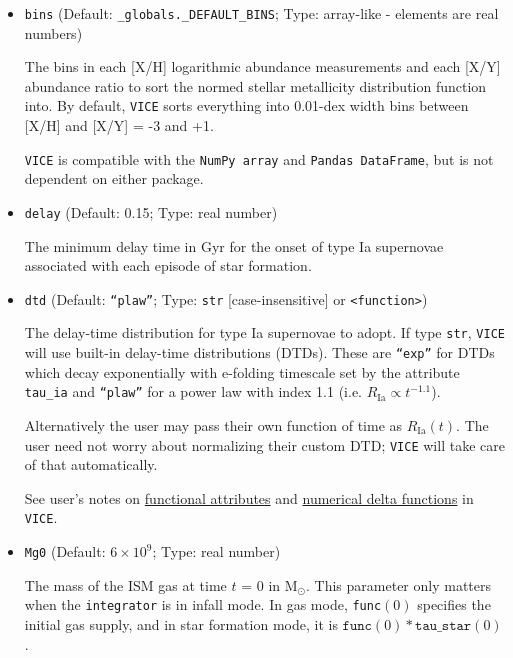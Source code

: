 \documentclass{report}
\begin{document}
\begin{itemize}
	\item{ %
		\texttt{bins} (Default: \texttt{\_globals.\_DEFAULT\_BINS}; Type: 
		array-like - elements are real numbers) 
		\par
		The bins in each [X/H] logarithmic abundance measurements and each 
		[X/Y] abundance ratio to sort the normed stellar metallicity 
		distribution function into. By default, \texttt{VICE} sorts everything 
		into 0.01-dex width bins between [X/H] and [X/Y] = -3 and +1. 
		\par
		\texttt{VICE} is compatible with the \texttt{NumPy array} and 
		\texttt{Pandas DataFrame}, but is not dependent on either package. 
	}

	\item{ %
		\texttt{delay} (Default: 0.15; Type: real number) 
		\par
		The minimum delay time in Gyr for the onset of type Ia supernovae 
		associated with each episode of star formation. 
	}

	\item{ %
		\texttt{dtd} (Default: \texttt{``plaw''}; Type: \texttt{str} 
		[case-insensitive] or \texttt{<function>}) 
		\par 
		The delay-time distribution for type Ia supernovae to adopt. If type 
		\texttt{str}, \texttt{VICE} will use built-in delay-time distributions 
		(DTDs). These are \texttt{``exp''} for DTDs which decay exponentially 
		with e-folding timescale set by the attribute \texttt{tau\_ia} and 
		\texttt{``plaw''} for a power law with index 1.1 (i.e. $R_\text{Ia} 
		\propto t^{-1.1}$). 
		\par
		Alternatively the user may pass their own function of time as 
		$R_\text{Ia}(t)$. The user need not worry about normalizing their 
		custom DTD; \texttt{VICE} will take care of that automatically. 
		\par
		See user's notes on \hyperlink{note:pyfuncs}{functional attributes} 
		and  \hyperlink{note:delta_funcs}{numerical delta functions} in 
		\texttt{VICE}. 
	}

	\item{ %
		\texttt{Mg0} (Default: $6\times10^9$; Type: real number) 
		\par
		The mass of the ISM gas at time $t$ = 0 in M$_\odot$. This parameter 
		only matters when the \texttt{integrator} is in infall mode. In gas 
		mode, \texttt{func}$(0)$ specifies the initial gas supply, and in star 
		formation mode, it is $\texttt{func}(0) * \texttt{tau\_star}(0)$. 
	}


\end{itemize}
\end{document}
